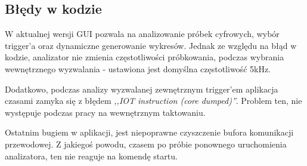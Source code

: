     \subsection{Błędy w kodzie}
        W aktualnej wersji GUI pozwala na analizowanie próbek cyfrowych, wybór trigger'a oraz dynamiczne generowanie wykresów.
        Jednak ze względu na błąd w kodzie, analizator nie zmienia częstotliwości próbkowania, podczas wybrania wewnętrznego wyzwalania - ustawiona jest domyślna częstotliwość 5kHz.
        
        Dodatkowo, podczas analizy wyzwalanej zewnętrznym trigger'em aplikacja czasami zamyka się z błędem \textit{,,IOT instruction (core dumped)''}.
        Problem ten, nie występuje podczas pracy na wewnętrznym taktowaniu.

        Ostatnim bugiem w aplikacji, jest niepoprawne czyszczenie bufora komunikacji przewodowej.
        Z jakiegoś powodu, czasem po próbie ponownego uruchomienia analizatora, ten nie reaguje na komendę startu.


